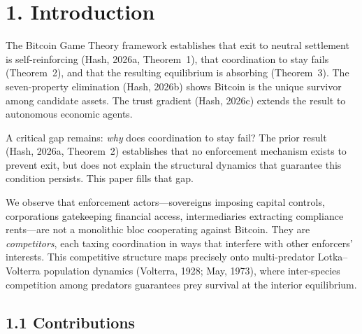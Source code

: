 \documentclass[12pt]{article}
\theoremstyle{definition}
\theoremstyle{remark}
\begin{document}
\section{1. Introduction}\label{sec:intro}

The Bitcoin Game Theory framework establishes that exit to neutral
settlement is self-reinforcing (Hash, 2026a, Theorem~1), that
coordination to stay fails (Theorem~2), and that the resulting
equilibrium is absorbing (Theorem~3). The seven-property elimination
(Hash, 2026b) shows Bitcoin is the unique survivor among candidate
assets. The trust gradient (Hash, 2026c) extends the result to
autonomous economic agents.

A critical gap remains: \emph{why} does coordination to stay fail?  The
prior result (Hash, 2026a, Theorem~2) establishes that no enforcement
mechanism exists to prevent exit, but does not explain the structural
dynamics that guarantee this condition persists. This paper fills that
gap.

We observe that enforcement actors---sovereigns imposing capital
controls, corporations gatekeeping financial access, intermediaries
extracting compliance rents---are not a monolithic bloc cooperating
against Bitcoin. They are \emph{competitors}, each taxing coordination
in ways that interfere with other enforcers' interests. This competitive
structure maps precisely onto multi-predator Lotka--Volterra population
dynamics (Volterra, 1928; May, 1973), where inter-species competition
among predators guarantees prey survival at the interior equilibrium.

\subsection{1.1 Contributions}
\end{document}
